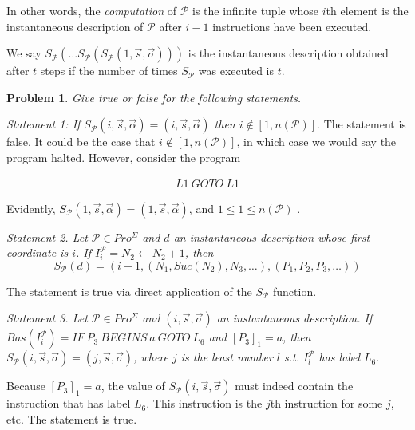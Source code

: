 \documentclass[a4paper, 12pt]{article}
\newtheorem{problem}{Problem}
\newtheorem{problem}{Problem}
\begin{document}
In other words, the \textit{computation} of $\mathcal{P}$ is the infinite tuple
whose $i$th element is the instantaneous description of $\mathcal{P}$ after $i -
1$ instructions have been executed.

We say $S_{\mathcal{P}} \left( \ldots S_{\mathcal{P}} \left(
S_{\mathcal{P}}\left( 1, \overrightarrow{s}, \overrightarrow{\sigma} \right)
\right)  \right) $ is the instantaneous description obtained after $t$ steps if
the number of times $S_{\mathcal{P}}$ was executed is $t$.

\begin{problem}
    Give true or false for the following statements.
\end{problem}

\textit{Statement 1: If $S_{\mathcal{P}}(i, \overrightarrow{s},
\overrightarrow{\alpha}) = (i, \overrightarrow{s}, \overrightarrow{\alpha})$
then $i \not\in [1, n(\mathcal{P})]$}. The statement is false. It could be the
case that $i \not\in [1, n( \mathcal{P} )]$, in which case we would say the program
halted. However, consider the program 

\begin{align*}
    L1 ~ GOTO ~ L1 
\end{align*}

Evidently, $S_{\mathcal{P}}(1, \overrightarrow{s}, \overrightarrow{\alpha}) =
(1, \overrightarrow{s}, \overrightarrow{\alpha})$, and $1 \leq 1 \leq
n(\mathcal{P})$ .

\textit{Statement 2. Let $\mathcal{P} \in Pro^{\Sigma}$ and $d$ an instantaneous
description whose first coordinate is $i$. If $I_i^{\mathcal{P}} = N_2
\leftarrow N_2 + 1$, then $$S_{\mathcal{P}}(d) = \left( i+1, \left( N_1,
Suc(N_2), N_3, \ldots \right), (P_1, P_2, P_3, \ldots)  \right) $$}

The statement is true via direct application of the $S_{\mathcal{P}}$ function.

\textit{Statement 3. Let $\mathcal{P} \in Pro^{\Sigma}$ and $(i,
\overrightarrow{s}, \overrightarrow{\sigma})$ an instantaneous description. If
$Bas(I_i^{\mathcal{P}}) = IF ~ P_3 ~ BEGINS ~ a ~ GOTO ~ L_6$ and $[P_3]_1 = a$,
then $S_{\mathcal{P}}(i, \overrightarrow{s}, \overrightarrow{\sigma}) = (j,
\overrightarrow{s}, \overrightarrow{\sigma})$, where $j$ is the least number $l$
s.t. $I_{l}^{\mathcal{P}}$ has label $L_6$}.

Because $[P_3]_1 = a$, the value of $S_{\mathcal{P}}(i, \overrightarrow{s},
\overrightarrow{\sigma})$ must indeed contain the instruction that has label
$L_6$. This instruction is the $j$th instruction for some $j$, etc. The
statement is true.
\end{document}
